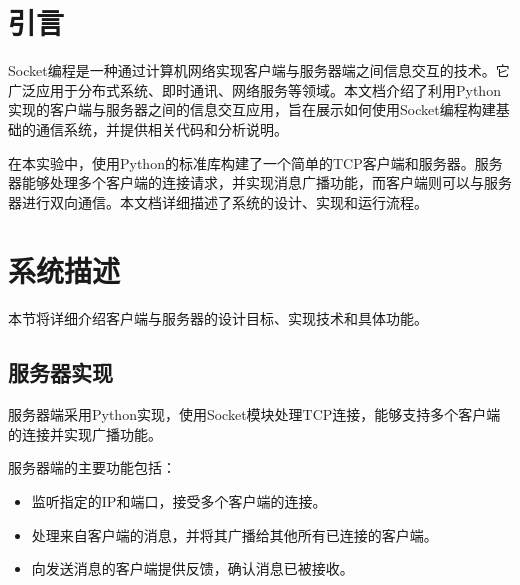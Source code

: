\documentclass[12pt]{article}
\begin{document}


\section{引言}
Socket编程是一种通过计算机网络实现客户端与服务器端之间信息交互的技术。它广泛应用于分布式系统、即时通讯、网络服务等领域。本文档介绍了利用Python实现的客户端与服务器之间的信息交互应用，旨在展示如何使用Socket编程构建基础的通信系统，并提供相关代码和分析说明。

在本实验中，使用Python的标准库构建了一个简单的TCP客户端和服务器。服务器能够处理多个客户端的连接请求，并实现消息广播功能，而客户端则可以与服务器进行双向通信。本文档详细描述了系统的设计、实现和运行流程。

\section{系统描述}
本节将详细介绍客户端与服务器的设计目标、实现技术和具体功能。

\subsection{服务器实现}
服务器端采用Python实现，使用Socket模块处理TCP连接，能够支持多个客户端的连接并实现广播功能。

服务器端的主要功能包括：
\begin{itemize}
    \item 监听指定的IP和端口，接受多个客户端的连接。
    \item 处理来自客户端的消息，并将其广播给其他所有已连接的客户端。
    \item 向发送消息的客户端提供反馈，确认消息已被接收。
\end{itemize}
\end{document}
